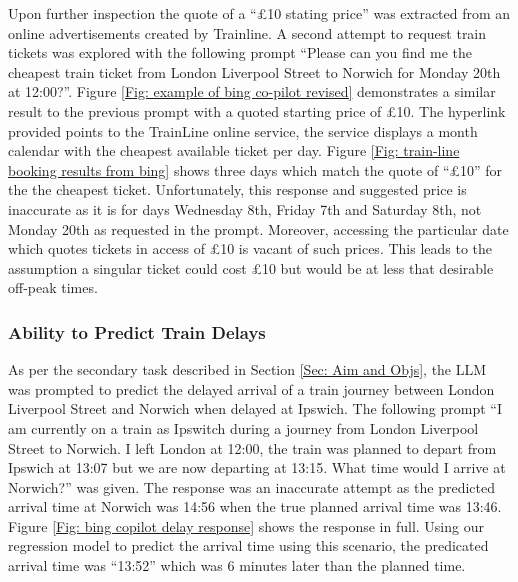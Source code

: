 \noindent
Upon further inspection the quote of a ``£10 stating price'' was extracted from an online advertisements created by Trainline. A second attempt to request train tickets was explored with the following prompt ``Please can you find me the cheapest train ticket from London Liverpool Street to Norwich for Monday 20th at 12:00?''. Figure \ref{Fig: example of bing co-pilot revised} demonstrates a similar result to the previous prompt with a quoted starting price of £10. The hyperlink provided points to the TrainLine online service, the service displays a month calendar with the cheapest available ticket per day. Figure \ref{Fig: train-line booking results from bing} shows three days which match the quote of ``£10'' for the the cheapest ticket. Unfortunately, this response and suggested price is inaccurate as it is for days Wednesday 8th, Friday 7th and Saturday 8th, not Monday 20th as requested in the prompt. Moreover, accessing the particular date which quotes tickets in access of £10 is vacant of such prices. This leads to the assumption a singular ticket could cost £10 but would be at less that desirable off-peak times.

\subsubsection{Ability to Predict Train Delays}\label{Sec: Co-pilot delay prediction}
As per the secondary task described in Section \ref{Sec: Aim and Objs}, the LLM was prompted to predict the delayed arrival of a train journey between London Liverpool Street and Norwich when delayed at Ipswich. The following prompt ``I am currently on a train as Ipswitch during a journey from London Liverpool Street to Norwich. I left London at 12:00, the train was planned to depart from Ipswich at 13:07 but we are now departing at 13:15. What time would I arrive at Norwich?'' was given. The response was an inaccurate attempt as the predicted arrival time at Norwich was 14:56 when the true planned arrival time was 13:46. %
Figure \ref{Fig: bing copilot delay response} shows the response in full. Using our regression model to predict the arrival time using this scenario, the predicated arrival time was ``13:52'' which was 6 minutes later than the planned time. 

